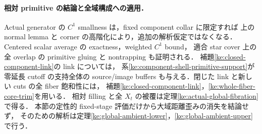 \paragraph{相対 primitive の結論と全域構成への適用．}
Actual generator の $C^1$ smallness は，fixed component collar に限定すれば
上の normal lemma と corner の高階化により，追加の解析仮定ではなくなる．
Centered scalar average の exactness，weighted $C^1$ bound，
適合 star cover 上の全 overlap の primitive gluing と nontrapping も証明される．
補題\ref{ke:closed-component-link}の link については，
系\ref{ke:component-shell-primitive-support}が零延長 cutoff の支持全体の
source/image buffers も与える．閉じた link と新しい cuts の全 fiber 飽和性には，
補題\ref{ke:closed-component-link}，\ref{ke:whole-fiber-core-trim}を用いる．
相対 filling と全 $X_t$ の被覆は定理\ref{ke:actual-global-fibration}で得る．
本節の定性的 fixed-stage 評価だけから大域距離歪みの消失を結論せず，
そのための解析は定理\ref{ke:global-ambient-lower}，\ref{ke:global-ambient-upper}で行う．

